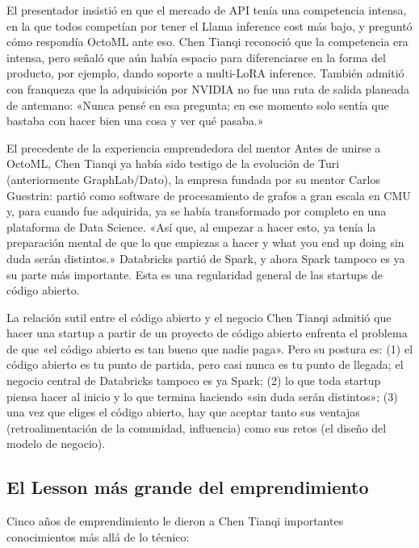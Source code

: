 \documentclass[a4paper]{article}
\begin{document}
El presentador insistió en que el mercado de API tenía una competencia intensa, en la que todos competían por tener el Llama inference cost más bajo, y preguntó cómo respondía OctoML ante eso. Chen Tianqi reconoció que la competencia era intensa, pero señaló que aún había espacio para diferenciarse en la forma del producto, por ejemplo, dando soporte a multi-LoRA inference. También admitió con franqueza que la adquisición por NVIDIA no fue una ruta de salida planeada de antemano: «Nunca pensé en esa pregunta; en ese momento solo sentía que bastaba con hacer bien una cosa y ver qué pasaba.»

\begin{knowledgebox}{El precedente de la experiencia emprendedora del mentor}
Antes de unirse a OctoML, Chen Tianqi ya había sido testigo de la evolución de Turi (anteriormente GraphLab/Dato), la empresa fundada por su mentor Carlos Guestrin: partió como software de procesamiento de grafos a gran escala en CMU y, para cuando fue adquirida, ya se había transformado por completo en una plataforma de Data Science. «Así que, al empezar a hacer esto, ya tenía la preparación mental de que lo que empiezas a hacer y what you end up doing sin duda serán distintos.» Databricks partió de Spark, y ahora Spark tampoco es ya su parte más importante. Esta es una regularidad general de las startups de código abierto.
\end{knowledgebox}

\begin{warningbox}{La relación sutil entre el código abierto y el negocio}
Chen Tianqi admitió que hacer una startup a partir de un proyecto de código abierto enfrenta el problema de que «el código abierto es tan bueno que nadie paga». Pero su postura es: (1) el código abierto es tu punto de partida, pero casi nunca es tu punto de llegada; el negocio central de Databricks tampoco es ya Spark; (2) lo que toda startup piensa hacer al inicio y lo que termina haciendo «sin duda serán distintos»; (3) una vez que eliges el código abierto, hay que aceptar tanto sus ventajas (retroalimentación de la comunidad, influencia) como sus retos (el diseño del modelo de negocio).
\end{warningbox}

\subsection{El Lesson más grande del emprendimiento}

Cinco años de emprendimiento le dieron a Chen Tianqi importantes conocimientos más allá de lo técnico:
\end{document}
